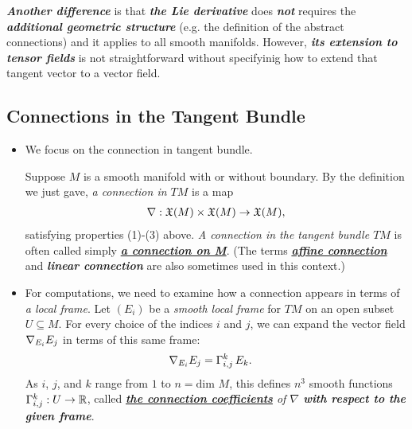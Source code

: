 \documentclass[11pt]{article}
\begin{document}
\begin{itemize}
\begin{remark}
\emph{\textbf{Another difference}} is that \emph{\textbf{the Lie derivative}} does \emph{\textbf{not}} requires the \emph{\textbf{additional geometric structure}} (e.g. the definition of the abstract connections) and it applies to all smooth manifolds. However, \emph{\textbf{its extension to tensor fields}} is not straightforward without specifyinig how to extend that tangent vector to a vector field.
\end{remark}
\end{itemize}

\subsection{Connections in the Tangent Bundle}
\begin{itemize}
\item We focus on the connection in tangent bundle.
\begin{definition}
Suppose $M$ is a smooth manifold with or without boundary. By the definition we just gave, \emph{a connection in $TM$} is a map
\begin{align*}
\nabla: {\mathfrak X}(M) \times {\mathfrak X}(M) \rightarrow {\mathfrak X}(M),
\end{align*}
satisfying properties (1)-(3) above. \emph{A connection in the tangent bundle $TM$} is often called simply \underline{\emph{\textbf{a connection on M}}}. (The terms \underline{\emph{\textbf{affine connection}}} and \emph{\textbf{linear connection}} are also sometimes used in this context.)
\end{definition}

\item \begin{definition}
For computations, we need to examine how a connection appears in terms of \emph{a local frame}. Let $(E_i)$ be a \emph{smooth local frame} for $TM$ on an open subset $U\subseteq M$. For every choice of the indices $i$ and $j$, we can expand the vector field $\nabla_{E_i}{E_j}$ in terms of this same frame:
\begin{align}
\nabla_{E_i}{E_j} &= \Gamma_{i,j}^{k}\,E_k. \label{eqn: christoffel_symbol_basis}
\end{align} As $i$, $j$, and $k$ range from $1$ to $n = \text{dim }M$, this defines $n^3$ smooth functions $\Gamma_{i,j}^{k}: U \rightarrow {\mathbb R}$, called \emph{\underline{\textbf{the connection coefficients}} of $\nabla$ \textbf{with respect to the given frame}}. 
\end{definition}


\end{itemize}
\end{document}
